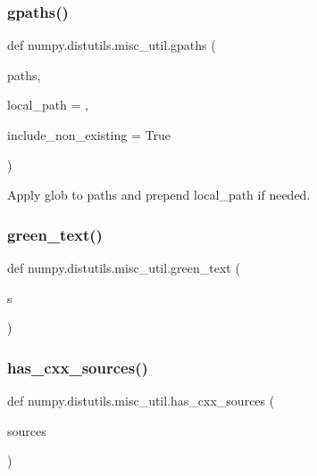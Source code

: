 \subsubsection{\texorpdfstring{gpaths()}{gpaths()}}
{\footnotesize\ttfamily def numpy.\+distutils.\+misc\+\_\+util.\+gpaths (\begin{DoxyParamCaption}\item[{}]{paths,  }\item[{}]{local\+\_\+path = {\ttfamily \textquotesingle{}\textquotesingle{}},  }\item[{}]{include\+\_\+non\+\_\+existing = {\ttfamily True} }\end{DoxyParamCaption})}

\begin{DoxyVerb}Apply glob to paths and prepend local_path if needed.
\end{DoxyVerb}
 \mbox{\label{namespacenumpy_1_1distutils_1_1misc__util_a03608f9a4dabe3bad62121c98eb2495b}} 
\subsubsection{\texorpdfstring{green\+\_\+text()}{green\_text()}}
{\footnotesize\ttfamily def numpy.\+distutils.\+misc\+\_\+util.\+green\+\_\+text (\begin{DoxyParamCaption}\item[{}]{s }\end{DoxyParamCaption})}

\mbox{\label{namespacenumpy_1_1distutils_1_1misc__util_a3184a5a3f353783f19b823b7370be16e}} 
\subsubsection{\texorpdfstring{has\+\_\+cxx\+\_\+sources()}{has\_cxx\_sources()}}
{\footnotesize\ttfamily def numpy.\+distutils.\+misc\+\_\+util.\+has\+\_\+cxx\+\_\+sources (\begin{DoxyParamCaption}\item[{}]{sources }\end{DoxyParamCaption})}


